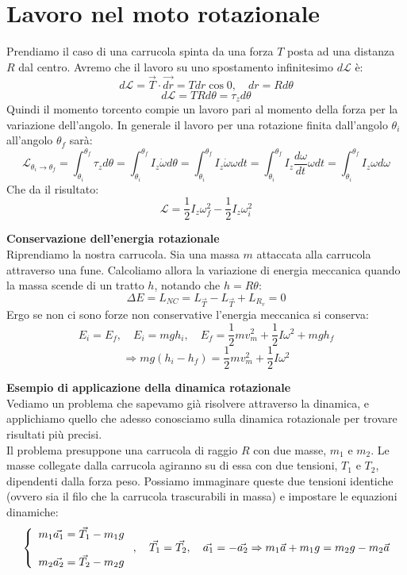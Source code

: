 \documentclass[a4paper,12pt]{article}
\begin{document}
\section{Lavoro nel moto rotazionale}
Prendiamo il caso di una carrucola spinta da una forza $T$ posta ad una distanza $R$ dal centro. Avremo che il lavoro su uno spostamento
infinitesimo $d\mathcal{L}$ è:
$$ d\mathcal{L} = \vec{T} \cdot \vec{dr} = T dr \cos{0}, \quad dr = Rd\theta $$
$$ d\mathcal{L} = TRd\theta = \tau_z d\theta $$
Quindi il momento torcento compie un lavoro pari al momento della forza per la variazione dell'angolo. In generale
il lavoro per una rotazione finita dall'angolo $\theta_i$ all'angolo $\theta_f$ sarà:
$$ \mathcal{L}_{\theta_i\rightarrow\theta_f} = \int_{\theta_i}^{\theta_f} \tau_z d\theta = \int_{\theta_i}^{\theta_f} I_z \dot{\omega} d\theta = \int_{\theta_i}^{\theta_f} I_z\dot{\omega}\omega dt = \int_{\theta_i}^{\theta_f} I_z \frac{d\omega}{dt}\omega dt = \int_{\theta_i}^{\theta_f} I_z \omega d\omega$$
Che da il risultato:
$$ \mathcal{L} = \frac{1}{2}I_z\omega_f^2 - \frac{1}{2}I_z\omega_i^2 $$
\par\smallskip
\textbf{Conservazione dell'energia rotazionale} \\
Riprendiamo la nostra carrucola. Sia una massa $m$ attaccata alla carrucola attraverso una fune. Calcoliamo allora la variazione di energia
meccanica quando la massa scende di un tratto $h$, notando che $h = R\theta$:
$$ \Delta E = L_{NC} = L_{\vec{T}} - L_{\vec{T}} + L_{R_v} = 0 $$
Ergo se non ci sono forze non conservative l'energia meccanica si conserva:
$$ E_i = E_f,\quad E_i = mgh_i, \quad E_f = \frac{1}{2}mv_m^2 + \frac{1}{2}I\omega^2 + mgh_f $$
$$ \Rightarrow mg(h_i-h_f) = \frac{1}{2}mv_m^2 + \frac{1}{2}I\omega^2 $$
\par\smallskip
\textbf{Esempio di applicazione della dinamica rotazionale} \\
Vediamo un problema che sapevamo già risolvere attraverso la dinamica, e applichiamo quello che adesso conosciamo sulla
dinamica rotazionale per trovare risultati più precisi. \\
Il problema presuppone una carrucola di raggio $R$ con due masse, $m_1$ e $m_2$. Le masse collegate dalla carrucola
agiranno su di essa con due tensioni, $T_1$ e $T_2$, dipendenti dalla forza peso. Possiamo immaginare queste due tensioni identiche
(ovvero sia il filo che la carrucola trascurabili in massa) e impostare le equazioni dinamiche:
$$ 
\left\{\begin{array}{l}
    m_1\vec{a_1} = \vec{T_1} - m_1g \cr \\
    m_2\vec{a_2} = \vec{T_2} - m_2g
\end{array}\right.
, \quad \vec{T_1} = \vec{T_2}, \quad \vec{a_1} = -\vec{a_2} \Rightarrow
m_1\vec{a}+m_1g = m_2g-m_2\vec{a}
$$
\end{document}
